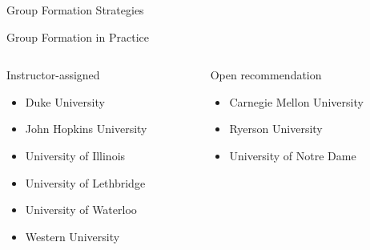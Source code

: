 \documentclass[12pt,table]{beamer}
\begin{document}
\begin{frame}{Group Formation Strategies \cite{chapman2006, potosky2014, pociask2017, hilton2010}}
    
\end{frame}

    
    
    

\begin{frame}{Group Formation in Practice}
\begin{columns}
    \begin{column}[T]{0.5\textwidth}
        \begin{alertblock}{Instructor-assigned}
        \begin{itemize}
            \item Duke University
            \item John Hopkins University
            \item University of Illinois
            \item University of Lethbridge
            \item University of Waterloo
            \item Western University
        \end{itemize}
        \end{alertblock}
    \end{column}
    \begin{column}[T]{0.5\textwidth}
        \begin{alertblock}{Open recommendation}
        \begin{itemize}
            \item Carnegie Mellon University
            \item Ryerson University
            \item University of Notre Dame
        \end{itemize}
        \end{alertblock}
    \end{column}
\end{columns}
\end{frame}
\end{document}
